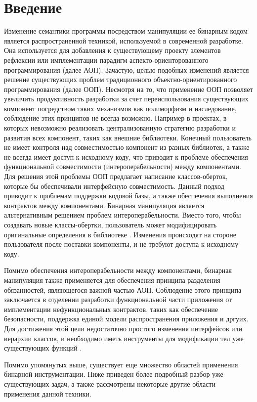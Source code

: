 \section{Введение}
\label{sec:Chapter0} 

Изменение семантики программы посредством манипуляции ее бинарным кодом является распространенной техникой, используемой в современной разработке. Она используется для добавления к существующему проекту элементов рефлексии или имплементации парадигм аспекто-ориенторованного программирования (далее АОП). Зачастую, целью подобных изменений является решение существующих проблем традиционного объектно-ориентированного программирования (далее ООП). Несмотря на то, что применение ООП позволяет увеличить продуктивность разработки за счет переиспользования существующих компонент посредством таких механизмов как полиморфизм и наследование, соблюдение этих принципов не всегда возможно. Например в проектах, в которых невозможно реализовать централизованную стратегию разработки и развития всех компонент, таких как внешние библиотеки. Конечный пользователь не имеет контроля над совместимостью компонент из разных библиотек, а также не всегда имеет доступ к исходному коду, что приводит к проблеме обеспечения функциональной совместимости (интероперабельности) между компонентами. Для решения этой проблемы ООП предлагает написание классов-оберток, которые бы обеспечивали интерфейсную совместимость. Данный подход приводит к проблемам поддержки кодовой базы, а также обеспечения выполнения контрактов между компонентами. Бинарная манипуляция является альтернативным решением проблем интероперабельности. Вместо того, чтобы создавать новые классы-обертки, пользователь может модифицировать оригинальные определения в библиотеке \cite{bca}. Изменения происходят на стороне пользователя после поставки компоненты, и не требуют доступа к исходному коду.

Помимо обеспечения интероперабельности между компонентами, бинарная манипуляция также применяется для обеспечения принципа разделения обязанностей, являющегося важной частью АОП. Соблюдение этого принципа заключается в отделении разработки функциональной части приложения от имплементации нефункциональных контрактов, таких как обеспечение безопасности, поддержка единой модели распространения приложения и дргуих. Для достижения этой цели недостаточно простого изменения интерфейсов или иерархии классов, и необходимо иметь инструменты для модификации тел уже существующих функций \cite{tanter2002}.

Помимо упомянутых выше, существует еще множество областей применения бинарной инструментации. Ниже приведен более подробный разбор уже существующих задач, а также рассмотрены некоторые другие области применения данной техники.

